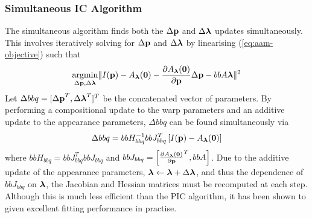 \subsubsection{Simultaneous IC Algorithm}\label{subsec:aam-simultaneous}
The simultaneous algorithm \cite{gross2005generic} finds both the $\Delta \boldsymbol{\mathbf{p}}$ and
$\Delta \boldsymbol{\mathbf{\lambda}}$ updates simultaneously. This involves iteratively solving for
$\Delta \boldsymbol{\mathbf{p}}$ and $\Delta \boldsymbol{\mathbf{\lambda}}$ by linearising (\ref{eq:aam-objective}) such
that
\begin{equation}\label{eq:aam-simultaneous-linearise}
    \argmin_{\Delta \p, \Delta \blambda} \norm{I(\p) - A_{\blambda}(\zero) - \frac{\partial A_{\blambda}(\zero)}{\partial \p} \Delta \p - bb{A} \blambda}^2
\end{equation}
Let $\Delta bb{q} = [{\Delta \boldsymbol{\mathbf{p}}}^T, {\Delta \boldsymbol{\mathbf{\lambda}}}^T]^T$ be the
concatenated vector of parameters. By performing a compositional update to the
warp parameters and an additive update to the appearance parameters, $\Delta
bb{q}$ can be found simultaneously via
\begin{equation}\label{eq:aam-simultaneous-deltaq-update}
    \Delta bb{q} = bb{H}_{bb{q}}^{-1} bb{J}_{bb{q}}^{T} \left[ I(\boldsymbol{\mathbf{p}}) - A_{\boldsymbol{\mathbf{\lambda}}}(\boldsymbol{\mathbf{0}}) \right]
\end{equation}
where $bb{H}_{bb{q}} = bb{J}_{bb{q}}^{T}
bb{J}_{bb{q}}$ and $bb{J}_{bb{q}} = \left[
{\frac{\partial A_{\boldsymbol{\mathbf{\lambda}}}(\boldsymbol{\mathbf{0}})}{\partial \boldsymbol{\mathbf{p}}}}^T, bb{A} \right]$.
Due to the additive update of the appearance parameters, $\boldsymbol{\mathbf{\lambda}} \leftarrow
\boldsymbol{\mathbf{\lambda}} + \Delta \boldsymbol{\mathbf{\lambda}}$, and thus the dependence of
$bb{J}_{bb{q}}$ on $\boldsymbol{\mathbf{\lambda}}$, the Jacobian and Hessian
matrices must be recomputed at each step. Although this is much less efficient
than the PIC algorithm, it has been shown to given excellent fitting performance
in practise.
